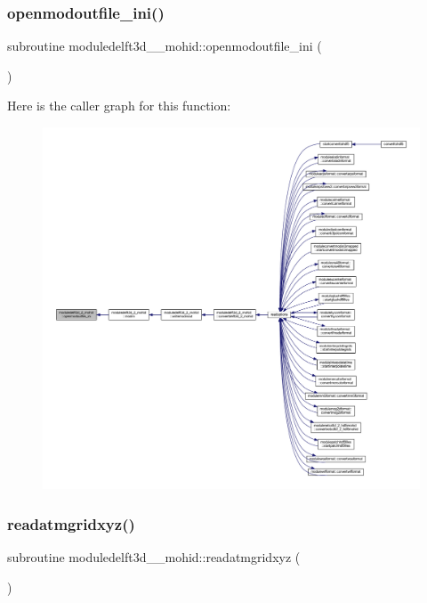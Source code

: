 \subsubsection{\texorpdfstring{openmodoutfile\+\_\+ini()}{openmodoutfile\_ini()}}
{\footnotesize\ttfamily subroutine moduledelft3d\+\_\+\_\+mohid\+::openmodoutfile\+\_\+ini (\begin{DoxyParamCaption}{ }\end{DoxyParamCaption})\hspace{0.3cm}{\ttfamily [private]}}

Here is the caller graph for this function\+:\nopagebreak
\begin{figure}[H]
\begin{center}
\leavevmode
\includegraphics[width=350pt]{namespacemoduledelft3d__2__mohid_aa98d814db6ab0cc5e69895b0124b6e95_icgraph}
\end{center}
\end{figure}
\mbox{\label{namespacemoduledelft3d__2__mohid_a8f18a6dd61d1e7402d91d20b87b39b18}} 
\subsubsection{\texorpdfstring{readatmgridxyz()}{readatmgridxyz()}}
{\footnotesize\ttfamily subroutine moduledelft3d\+\_\+\_\+mohid\+::readatmgridxyz (\begin{DoxyParamCaption}{ }\end{DoxyParamCaption})\hspace{0.3cm}{\ttfamily [private]}}


